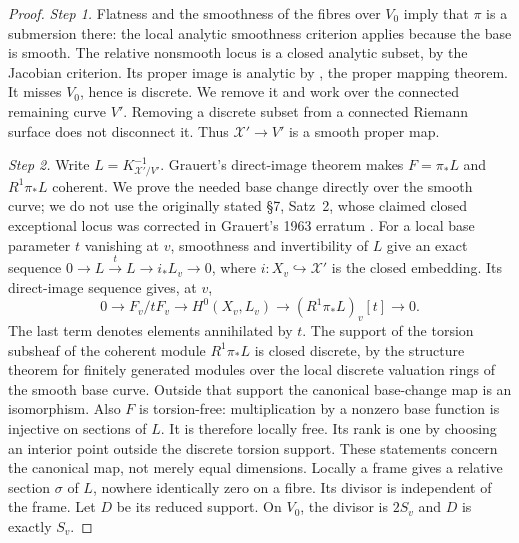\documentclass[11pt,a4paper]{article}
\theoremstyle{plain}
\theoremstyle{definition}
\begin{document}
\begin{proof}
\par\noindent\textit{Step 1.} Flatness and the smoothness of the fibres over \(V_0\) imply that
\(\pi\) is a submersion there: the local analytic smoothness criterion
applies because the base is smooth. The relative nonsmooth locus is a
closed analytic subset, by the Jacobian criterion. Its proper image is
analytic by \cite[\S7, Satz~1]{Grauert1960D}, the proper mapping theorem.
It misses \(V_0\), hence is discrete. We remove it and work over the
connected remaining curve \(V'\). Removing a discrete subset from a
connected Riemann surface does not disconnect it. Thus
\(\mathcal X'\to V'\) is a smooth proper map.

\par\noindent\textit{Step 2.} Write \(L=K_{\mathcal X'/V'}^{-1}\). Grauert's direct-image theorem \cite[\S6, Hauptsatz~I]{Grauert1960D} makes \(F=\pi_*L\) and \(R^1\pi_*L\)
coherent. We prove the needed base change directly over the smooth
curve; we do not use the originally stated \S7, Satz~2, whose claimed
closed exceptional locus was corrected in Grauert's 1963 erratum \cite[item~2, p.~36]{Grauert1963ErratumD}.
For a local base parameter \(t\) vanishing at \(v\), smoothness and
invertibility of \(L\) give an exact sequence
\(0\to L\xrightarrow{t}L\to i_*L_v\to0\), where
\(i:X_v\hookrightarrow\mathcal X'\) is the closed embedding.
Its direct-image sequence gives, at \(v\),
\[
 0\longrightarrow F_v/tF_v\longrightarrow H^0(X_v,L_v)
 \longrightarrow (R^1\pi_*L)_v[t]\longrightarrow0.
\]
The last term denotes elements annihilated by \(t\). The support of
the torsion subsheaf of the coherent module \(R^1\pi_*L\) is closed
discrete, by the structure theorem for finitely generated modules
over the local discrete valuation rings of the smooth base curve.
Outside that support the canonical base-change map is an isomorphism.
Also \(F\) is torsion-free: multiplication by a nonzero base function
is injective on sections of \(L\). It is therefore locally free.
Its rank is one by choosing an interior point outside the discrete
torsion support. These statements concern the canonical map, not
merely equal dimensions.
Locally a frame gives a relative section \(\sigma\) of \(L\),
nowhere identically zero on a fibre. Its divisor is independent of the
frame. Let \(D\) be its reduced support. On \(V_0\), the divisor is
\(2S_v\) and \(D\) is exactly \(S_v\).


\end{proof}
\end{document}
